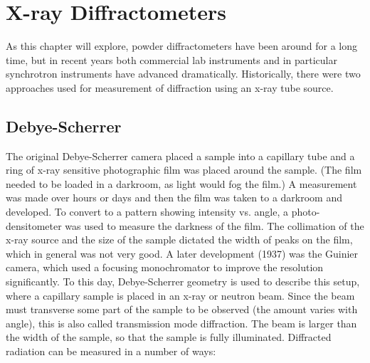\chapter{X-ray Diffractometers}

As this chapter will explore, powder diffractometers have been around for a long time, but in recent years both commercial lab instruments and in particular synchrotron instruments have advanced dramatically. 
Historically, there were two approaches used for measurement of diffraction using an x-ray tube source. 

\section{Debye-Scherrer}
The original Debye-Scherrer camera placed a sample into a capillary tube and a ring of x-ray sensitive photographic film was placed around the sample. (The film needed to be loaded in a darkroom, as light would fog the film.) A measurement was made over hours or days and then the film was taken to a darkroom and developed. To convert to a pattern showing intensity vs. angle, a photo-densitometer was used to measure the darkness of the film. The collimation of the x-ray source and the size of the sample dictated the width of peaks on the film, which in general was not very good. A later development (1937) was the Guinier camera, which used a focusing monochromator to improve the resolution significantly. To this day, Debye-Scherrer geometry is used to describe this setup, where a capillary sample is placed in an x-ray or neutron beam. Since the beam must transverse some part of the sample to be observed (the amount varies with angle), this is also called transmission mode diffraction. The beam is larger than the width of the sample, so that the sample is fully illuminated. Diffracted radiation can be measured in a number of ways: 
